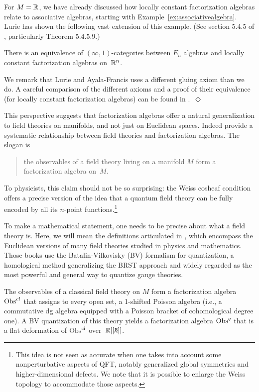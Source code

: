 \documentclass[11pt]{amsart}
\begin{document}
For $M = \mathbb R$, we have already discussed how locally constant factorization algebras relate to associative algebras, starting with Example~\ref{ex:associativealgebra}.
Lurie has shown the following vast extension of this example. (See section 5.4.5 of \cite{LurieHA}, particularly Theorem 5.4.5.9.)

\begin{thm}\label{thm:locisen}
There is an equivalence of $(\infty,1)$-categories between $E_n$ algebras and locally constant factorization algebras on~$\mathbb R^n$.  
\end{thm}  

\begin{rmk}
We remark that Lurie and Ayala-Francis uses a different gluing axiom than we do. A careful comparison of the different axioms and a proof of their equivalence (for locally constant factorization algebras) can be found in \cite{Matsuoka}.~\hfill $\Diamond$
\end{rmk}

This perspective suggests that factorization algebras offer a natural generalization to field theories on manifolds, and not just on Euclidean spaces. Indeed \cite{CG1, CG2} provide a systematic relationship between field theories and factorization algebras.
The slogan is 
\begin{quote}
the observables of a field theory living on a manifold $M$ form a factorization algebra on~$M$. 
\end{quote}
To physicists, this claim should not be so surprising:
the Weiss cosheaf condition offers a precise version of the idea that a quantum field theory can be fully encoded by all its $n$-point functions.\footnote{This idea is not seen as accurate when one takes into account some nonperturbative aspects of QFT, notably generalized global symmetries and higher-dimensional defects. We note that it is possible to enlarge the Weiss topology to accommodate those aspects.}

To make a mathematical statement, one needs to be precise about what a field theory is.
Here, we will mean the definitions articulated in \cite{CosBook,CG1, CG2}, which encompass the Euclidean versions of many field theories studied in physics and mathematics.
Those books use the Batalin-Vilkovisky (BV) formalism for quantization, a homological method generalizing the BRST approach and widely regarded as the most powerful and general way to quantize gauge theories. 

\begin{thm}
\label{main}
The observables of a classical field theory on $M$ form a factorization algebra ${\rm Obs}^{cl}$ that assigns to every open set, a 1-shifted Poisson algebra (i.e., a commutative dg algebra equipped with a Poisson bracket of cohomological degree one). A BV quantization of this theory yields a factorization algebra ${\rm Obs}^q$ that is a flat deformation of ${\rm Obs}^{cl}$ over~$\mathbb R[[\hbar]]$.
\end{thm}
\end{document}
